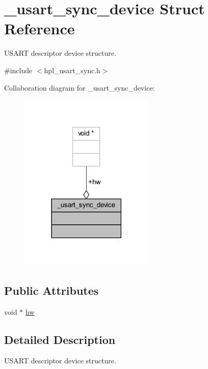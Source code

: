 \hypertarget{struct__usart__sync__device}{}\section{\+\_\+usart\+\_\+sync\+\_\+device Struct Reference}
\label{struct__usart__sync__device}


U\+S\+A\+RT descriptor device structure.  




{\ttfamily \#include $<$hpl\+\_\+usart\+\_\+sync.\+h$>$}



Collaboration diagram for \+\_\+usart\+\_\+sync\+\_\+device\+:
\nopagebreak
\begin{figure}[H]
\begin{center}
\leavevmode
\includegraphics[width=182pt]{struct__usart__sync__device__coll__graph}
\end{center}
\end{figure}
\subsection*{Public Attributes}
\begin{DoxyCompactItemize}
\item 
void $\ast$ \hyperlink{struct__usart__sync__device_a299ec1be7b3e3f53a8f8921823a3480c}{hw}
\end{DoxyCompactItemize}


\subsection{Detailed Description}
U\+S\+A\+RT descriptor device structure. 

